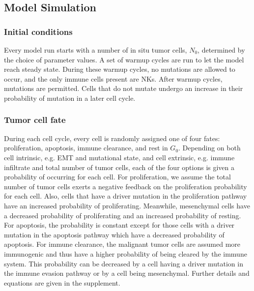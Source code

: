 \documentclass[11pt]{article}
\begin{document}
\subsection{Model Simulation}
\subsubsection{Initial conditions} 
Every model run starts with a number of in situ tumor cells, $N_0$, determined by the choice of parameter values.
A set of warmup cycles are run to let the model reach steady state.
During these warmup cycles, no mutations are allowed to occur, and the only immune cells present are NKs.
After  warmup cycles, mutations are permitted. Cells that do not mutate undergo an increase in their probability of mutation in a later cell cycle.

\subsubsection{Tumor cell fate}
During each cell cycle, every cell is randomly assigned one of four fates: proliferation, apoptosis, immune clearance, and rest in $G_0$.
Depending on both cell intrinsic, e.g. EMT and mutational state, and cell extrinsic, e.g. immune infiltrate and total number of tumor cells, each of the four options is given a probability of occurring for each cell.
For proliferation, we assume the total number of tumor cells exerts a negative feedback on the proliferation probability for each cell.
Also, cells that have a driver mutation in the proliferation pathway have an increased probability of proliferating.
Meanwhile, mesenchymal cells have a decreased probability of proliferating and an increased probability of resting.
For apoptosis, the probability is constant except for those cells with a driver mutation in the apoptosis pathway which have a decreased probability of apoptosis.
For immune clearance, the malignant tumor cells are assumed more immunogenic and thus have a higher probability of being cleared by the immune system.
This probability can be decreased by a cell having a driver mutation in the immune evasion pathway or by a cell being mesenchymal.
Further details and equations are given in the supplement.
\end{document}

